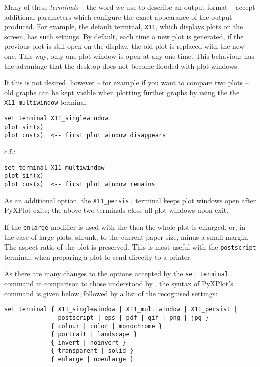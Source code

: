 Many of these {\it terminals} -- the word we use to describe an output format
-- accept additional parameters which configure the exact appearance of the
output produced.  For example, the default terminal, {\tt X11}, which displays
plots on the screen, has such settings. By default, each time a new plot is
generated, if the previous plot is still open on the display, the old plot is
replaced with the new one. This way, only one plot window is open at any one
time.  This behaviour has the advantage that the desktop does not become
flooded with plot windows.

If this is not desired, however -- for example if you want to compare two plots
-- old graphs can be kept visible when plotting further graphs by using the the
{\tt X11\_multiwindow} terminal:

\begin{verbatim} 
set terminal X11_singlewindow
plot sin(x)
plot cos(x)  <-- first plot window disappears
\end{verbatim}

\noindent c.f.:

\begin{verbatim} 
set terminal X11_multiwindow
plot sin(x)
plot cos(x)  <-- first plot window remains
\end{verbatim}

As an additional option, the {\tt X11\_persist} terminal keeps plot windows
open after PyXPlot exits; the above two terminals close all plot windows upon
exit.

If the {\tt enlarge} modifier is used with the  then the
whole plot is enlarged, or, in the case of large plots, shrunk, to the current
paper size, minus a small margin. The aspect ratio of the plot is preserved.
This is most useful with the {\tt postscript} terminal, when preparing a plot
to send directly to a printer.

As there are many changes to the options accepted by the {\tt set terminal}
command in comparison to those understood by \gnuplot, the syntax of PyXPlot's
command is given below, followed by a list of the recognised settings:

\begin{verbatim} 
set terminal { X11_singlewindow | X11_multiwindow | X11_persist |
               postscript | eps | pdf | gif | png | jpg }
             { colour | color | monochrome }
             { portrait | landscape }
             { invert | noinvert }
             { transparent | solid }
             { enlarge | noenlarge }
\end{verbatim}

